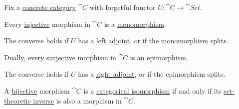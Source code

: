 \begin{proposition}\label{thm:concrete_category_function_invertibility}
  Fix a \hyperref[def:concrete_category]{concrete category} \( \cat{C} \) with forgetful functor \( U: \cat{C} \to \cat{Set} \).

  \begin{thmenum}
     Every \hyperref[def:function_invertibility/injective]{injective} morphism in \( \cat{C} \) is a \hyperref[def:morphism_cancellation/left]{monomorphism}.

    The converse holds if \( U \) has a \hyperref[def:adjoint_functor]{left adjoint}, or if the monomorphism splits.

     Dually, every \hyperref[def:function_invertibility/surjective]{surjective} morphism in \( \cat{C} \) is an \hyperref[def:morphism_cancellation/right]{epimorphism}.

    The converse holds if \( U \) has a \hyperref[def:adjoint_functor]{right adjoint}, or if the epimorphism splits.

     A \hyperref[def:function_invertibility/bijective]{bijective} morphism \( \cat{C} \) is a \hyperref[def:morphism_invertibility/isomorphism]{categorical isomorphism} if and only if its \hyperref[def:set_valued_function/inverse]{set-theoretic inverse} is also a morphism in \( \cat{C} \).
  \end{thmenum}
\end{proposition}
